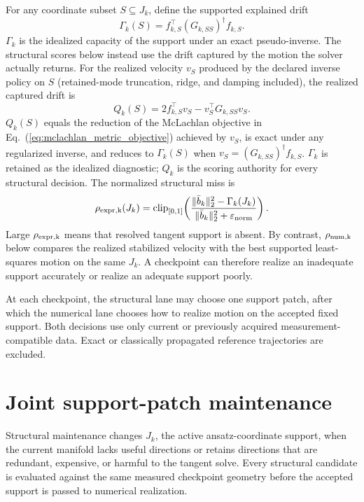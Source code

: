 \documentclass[
  reprint,
  amsmath,
  amssymb,
  aps,
  pra,
  nofootinbib,
  superscriptaddress,
  floatfix
]{revtex4-2}
\newcommand{\eps}{\varepsilon}
\begin{document}
For any coordinate subset $S\subseteq J_k$, define the supported explained drift
\begin{equation}
\Gamma_k(S)
=f_{k,S}^{\top}(G_{k,SS})^\dagger f_{k,S}.
\label{eq:explained_drift}
\end{equation}
$\Gamma_k$ is the idealized capacity of the support under an exact pseudo-inverse.  The structural scores below instead use the drift captured by the motion the solver actually returns.  For the realized velocity $v_S$ produced by the declared inverse policy on $S$ (retained-mode truncation, ridge, and damping included), the realized captured drift is
\begin{equation}
Q_k(S)
=2f_{k,S}^{\top}v_S-v_S^{\top}G_{k,SS}v_S.
\label{eq:realized_captured_drift}
\end{equation}
$Q_k(S)$ equals the reduction of the McLachlan objective in Eq.~(\ref{eq:mclachlan_metric_objective}) achieved by $v_S$, is exact under any regularized inverse, and reduces to $\Gamma_k(S)$ when $v_S=(G_{k,SS})^\dagger f_{k,S}$.  $\Gamma_k$ is retained as the idealized diagnostic; $Q_k$ is the scoring authority for every structural decision.
The normalized structural miss is
\begin{equation}
\rho_{\rm expr,k}(J_k)
=\operatorname{clip}_{[0,1]}\!\left(
\frac{\|\bar b_k\|_2^2-\Gamma_k(J_k)}
{\|\bar b_k\|_2^2+\eps_{\rm norm}}
\right).
\label{eq:active_structural_miss}
\end{equation}
Large $\rho_{\rm expr,k}$ means that resolved tangent support is absent.  By contrast, $\rho_{\rm num,k}$ below compares the realized stabilized velocity with the best supported least-squares motion on the same $J_k$.  A checkpoint can therefore realize an inadequate support accurately or realize an adequate support poorly.

At each checkpoint, the structural lane may choose one support patch, after which the numerical lane chooses how to realize motion on the accepted fixed support.  Both decisions use only current or previously acquired measurement-compatible data.  Exact or classically propagated reference trajectories are excluded.

\section{Joint support-patch maintenance}
\label{sec:structural_support}

Structural maintenance changes \(J_k\), the active ansatz-coordinate support, when the current manifold lacks useful directions or retains directions that are redundant, expensive, or harmful to the tangent solve.  Every structural candidate is evaluated against the same measured checkpoint geometry before the accepted support is passed to numerical realization.
\end{document}
